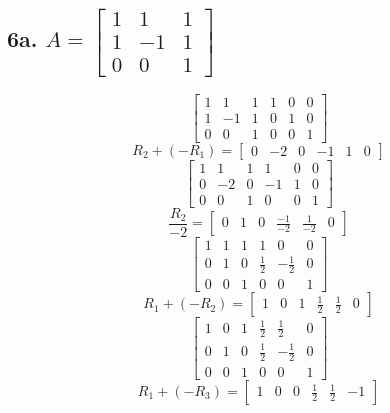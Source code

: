 \documentclass[11pt]{article}
\begin{document}
\subsection*{6a. \(A = 
    \begin{bmatrix}
        1 & 1 & 1 \\
        1 & -1 & 1 \\
        0 & 0 & 1
    \end{bmatrix}
    \)}
\[
    \left[
    \begin{array}{ccc|ccc}
        1 & 1 & 1 & 1 & 0 & 0 \\
        1 & -1 & 1 & 0 & 1 & 0 \\
        0 & 0 & 1 & 0 & 0 & 1
    \end{array}
    \right]
\]
\[
    R_2 + (-R_1) = 
    \left[
    \begin{array}{ccc|ccc}
        0 & -2 & 0 & -1 & 1 & 0
    \end{array}
    \right]
\]
\[
    \left[
    \begin{array}{ccc|ccc}
        1 & 1 & 1 & 1 & 0 & 0 \\
        0 & -2 & 0 & -1 & 1 & 0 \\
        0 & 0 & 1 & 0 & 0 & 1
    \end{array}
    \right]
\]
\[
    \frac{R_2}{-2} =
    \left[
    \begin{array}{ccc|ccc}
        0 & 1 & 0 & \frac{-1}{-2} & \frac{1}{-2} & 0
    \end{array}
    \right]
\]
\[
    \left[
    \begin{array}{ccc|ccc}
        1 & 1 & 1 & 1 & 0 & 0 \\
        0 & 1 & 0 & \frac{1}{2} & -\frac{1}{2} & 0 \\
        0 & 0 & 1 & 0 & 0 & 1
    \end{array}
    \right]
\]
\[
    R_1 + (-R_2) = 
    \left[
    \begin{array}{ccc|ccc}
        1 & 0 & 1 & \frac{1}{2} & \frac{1}{2} & 0
    \end{array}
    \right]
\]
\[
    \left[
    \begin{array}{ccc|ccc}
        1 & 0 & 1 & \frac{1}{2} & \frac{1}{2} & 0 \\
        0 & 1 & 0 & \frac{1}{2} & -\frac{1}{2} & 0 \\
        0 & 0 & 1 & 0 & 0 & 1
    \end{array}
    \right]
\]
\[
    R_1 + (-R_3) = 
    \left[
    \begin{array}{ccc|ccc}
        1 & 0 & 0 & \frac{1}{2} & \frac{1}{2} & -1
    \end{array}
    \right]
\]
\end{document}
